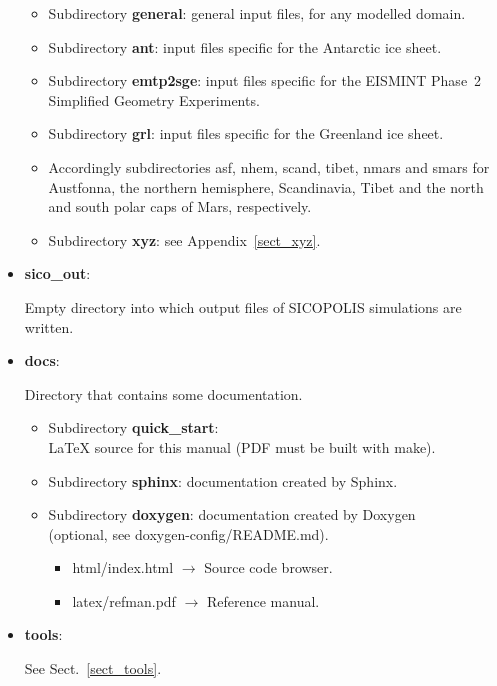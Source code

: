 \documentclass[12pt,a4paper]{article}
\begin{document}
\begin{itemize}
\begin{itemize}
\item
Subdirectory \textbf{general}: general input files, for any modelled domain.

\item
Subdirectory \textbf{ant}: input files specific for the Antarctic ice sheet.

\item
Subdirectory \textbf{emtp2sge}: input files specific for the EISMINT Phase~2 Simplified Geometry Experiments.

\item
Subdirectory \textbf{grl}: input files specific for the Greenland ice sheet.

\item
Accordingly subdirectories asf, nhem, scand, tibet, nmars and smars for Austfonna, the northern hemisphere, Scandinavia, Tibet and the north and south polar caps of Mars, respectively.

\item
Subdirectory \textbf{xyz}: see Appendix~\ref{sect_xyz}.

\end{itemize}

\item \textbf{sico\_out}:

Empty directory into which output files of SICOPOLIS simulations are written.

\item \textbf{docs}:

Directory that contains some documentation.

\begin{itemize}

\item
Subdirectory \textbf{quick\_start}:\\
\LaTeX{} source for this manual (PDF must be built with make).

\item
Subdirectory \textbf{sphinx}: documentation created by Sphinx.

\item
Subdirectory \textbf{doxygen}: documentation created by Doxygen\\
(optional, see doxygen-config/README.md).

\begin{itemize}

\item html/index.html $\longrightarrow$ Source code browser.

\item latex/refman.pdf $\longrightarrow$ Reference manual.

\end{itemize}

\end{itemize}

\item \textbf{tools}:

See Sect.~\ref{sect_tools}.

\end{itemize}
\end{document}
